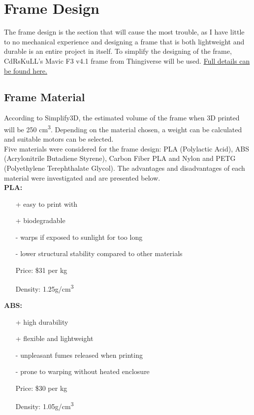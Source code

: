 \documentclass[12pt]{article}
\begin{document}
\section{Frame Design}

The frame design is the section that will cause the most trouble, as I have little to no mechanical experience and designing a frame that is both lightweight and durable is an entire project in itself. To simplify the designing of the frame, CdRsKuLL's Mavic F3 v4.1 frame from Thingiverse will be used. \href{http://diyrc.co.uk/3d-printed-mavic-clone/mavic-clone-stl-files-version-3-0-f3/}{\color{cyan}Full details can be found here.}

\subsection{Frame Material}

According to Simplify3D, the estimated volume of the frame when 3D printed will be 250 cm\textsuperscript{3}. Depending on the material chosen, a weight can be calculated and suitable motors can be selected.
\\

Five materials were considered for the frame design: PLA (Polylactic Acid), ABS (Acrylonitrile Butadiene Styrene), Carbon Fiber PLA and Nylon and PETG (Polyethylene Terephthalate Glycol). The advantages and disadvantages of each material were investigated and are presented below.
\\

\vspace{5mm}
\textbf{PLA:}
\renewcommand{\labelitemi}{\textperiodcentered}
\begin{itemize}
\item[+] easy to print with
\item[+] biodegradable
\item[-] warps if exposed to sunlight for too long
\item[-] lower structural stability compared to other materials
\item[Price:] \$31 per kg 
\item[Density:] 1.25g/cm\textsuperscript{3}
\end{itemize}
\vspace{5mm}


\textbf{ABS:}
\renewcommand{\labelitemi}{\textperiodcentered}
\begin{itemize}
\item[+] high durability
\item[+] flexible and lightweight
\item[-] unpleasant fumes released when printing
\item[-] prone to warping without heated enclosure
\item[Price:] \$30 per kg
\item[Density:] 1.05g/cm\textsuperscript{3}
\end{itemize}
\vspace{5mm}
\end{document}
